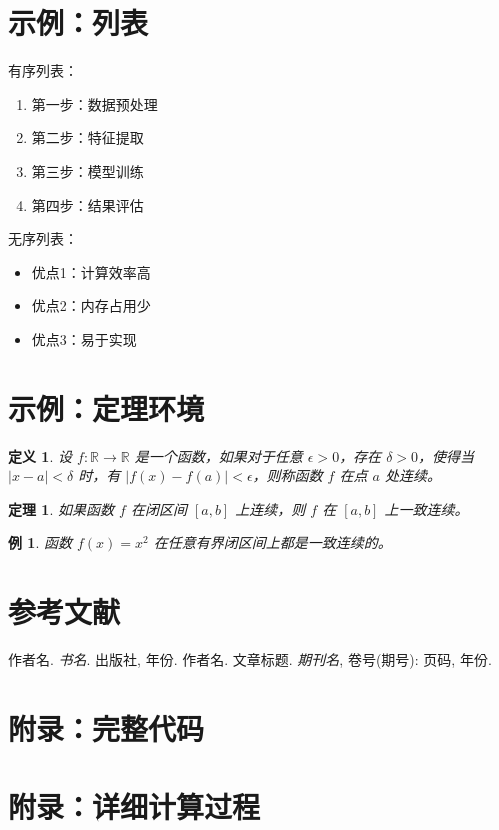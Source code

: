 \documentclass[12pt,a4paper]{article}
\numberwithin{equation}{section}
\newtheorem{theorem}{定理}[section]
\newtheorem{definition}{定义}[section]
\newtheorem{example}{例}[section]
\begin{document}
\section{示例：列表}

有序列表：
\begin{enumerate}
    \item 第一步：数据预处理
    \item 第二步：特征提取
    \item 第三步：模型训练
    \item 第四步：结果评估
\end{enumerate}

无序列表：
\begin{itemize}
    \item 优点1：计算效率高
    \item 优点2：内存占用少
    \item 优点3：易于实现
\end{itemize}

\section{示例：定理环境}

\begin{definition}
设 $f: \mathbb{R} \to \mathbb{R}$ 是一个函数，如果对于任意 $\epsilon > 0$，存在 $\delta > 0$，使得当 $|x - a| < \delta$ 时，有 $|f(x) - f(a)| < \epsilon$，则称函数 $f$ 在点 $a$ 处连续。
\end{definition}

\begin{theorem}
如果函数 $f$ 在闭区间 $[a,b]$ 上连续，则 $f$ 在 $[a,b]$ 上一致连续。
\end{theorem}

\begin{example}
函数 $f(x) = x^2$ 在任意有界闭区间上都是一致连续的。
\end{example}

\newpage
\section*{参考文献}

\begin{thebibliography}{99}
 作者名. \textit{书名}. 出版社, 年份.
 作者名. 文章标题. \textit{期刊名}, 卷号(期号): 页码, 年份.
\end{thebibliography}

\newpage
\appendix
\section{附录：完整代码}
\label{app:code}

% 

\section{附录：详细计算过程}
\label{app:calc}

\end{document}
